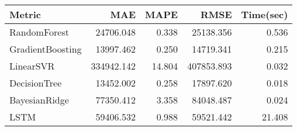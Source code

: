 \begin{tabular}{lrrrr}
\toprule
Metric &         MAE &    MAPE &        RMSE &  Time(sec) \\
\midrule
RandomForest     &   24706.048 &   0.338 &   25138.356 &      0.536 \\
GradientBoosting &   13997.462 &   0.250 &   14719.341 &      0.215 \\
LinearSVR        &  334942.142 &  14.804 &  407853.893 &      0.032 \\
DecisionTree     &   13452.002 &   0.258 &   17897.620 &      0.018 \\
BayesianRidge    &   77350.412 &   3.358 &   84048.487 &      0.024 \\
LSTM             &   59406.532 &   0.988 &   59521.442 &     21.408 \\
\bottomrule
\end{tabular}
